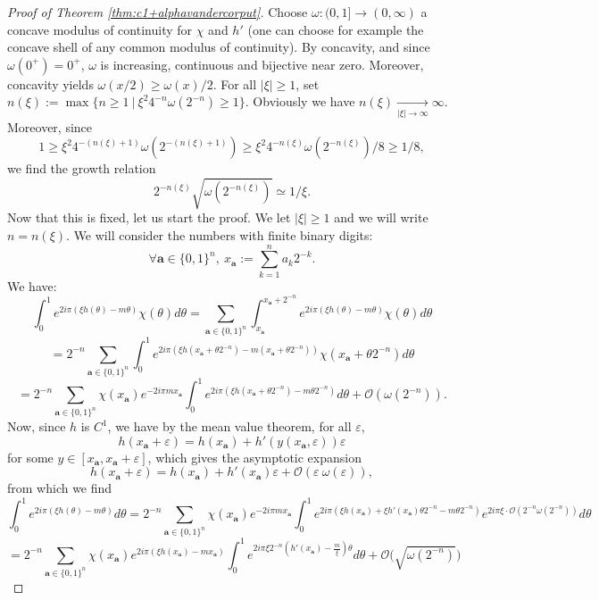 \documentclass[11pt]{amsart}
\theoremstyle{plain}
\theoremstyle{definition}
\numberwithin{equation}{section}
\begin{document}
\begin{proof}[Proof of Theorem \ref{thm:c1+alphavandercorput}]
Choose $\omega:(0,1] \rightarrow (0,\infty)$ a concave modulus of continuity for $\chi$ and $h'$ (one can choose for example the concave shell of any common modulus of continuity). By concavity, and since $\omega(0^+)=0^+$, $\omega$ is increasing, continuous and bijective near zero. Moreover, concavity yields $\omega(x/2) \geq \omega(x)/2$. For all $|\xi| \geq 1$, set $n(\xi) := \max \{ n \geq 1 \ | \ \xi^2 4^{-n} \omega(2^{-n}) \geq 1 \}$. Obviously we have $n(\xi) \underset{|\xi| \rightarrow \infty}{\longrightarrow} \infty$. Moreover, since $$ 1 \geq \xi^{2} 4^{-(n(\xi)+1)} \omega(2^{-(n(\xi)+1)}) \geq \xi^{2} 4^{-n(\xi)} \omega(2^{-n(\xi)})/8 \geq 1/8 ,$$
we find the growth relation
$$ 2^{-n(\xi)} \sqrt{\omega(2^{-n(\xi)})} \simeq 1/\xi .$$
Now that this is fixed, let us start the proof. We let $|\xi| \geq 1$ and we will write $n=n(\xi)$.
We will consider the numbers with finite binary digits: $$\forall \mathbf{a} \in \{0,1\}^{n}, \ x_\mathbf{a} := \sum_{k=1}^n a_k 2^{-k}.$$ We have:
$$\int_{0}^1 e^{2 i \pi (\xi h(\theta) - m \theta)} \chi(\theta) d\theta = \sum_{\mathbf{a} \in \{0,1\}^n} \int_{x_\mathbf{a}}^{x_{\mathbf{a}}+2^{-n}} e^{2 i \pi (\xi h(\theta) - m \theta)} \chi(\theta) d\theta  $$
$$ = 2^{-n} \sum_{\mathbf{a} \in \{0,1\}^n} \int_{0}^{1} e^{2 i \pi (\xi h(x_\mathbf{a}+\theta 2^{-n}) - m (x_\mathbf{a} + \theta 2^{-n}))} \chi(x_\mathbf{a}+\theta 2^{-n}) d\theta $$
$$ = 2^{-n} \sum_{\mathbf{a} \in \{0,1\}^n}  \chi(x_\mathbf{a}) e^{-2 i \pi m x_\mathbf{a}}\int_{0}^{1} e^{2 i \pi (\xi h(x_\mathbf{a}+\theta 2^{-n}) - m \theta 2^{-n})}  d\theta + \mathcal{O}(\omega(2^{-n})).$$
Now, since $h$ is $C^{1}$, we have by the mean value theorem, for all $\varepsilon$,
$$ h(x_{\mathbf{a}} + \varepsilon) = h(x_\mathbf{a})+h'(y(x_{\mathbf{a}},\varepsilon)) \varepsilon $$ for some $y \in [x_\mathbf{a},x_{\mathbf{a}}+\varepsilon]$, which gives the asymptotic expansion
$$ h(x_{\mathbf{a}} + \varepsilon) = h(x_\mathbf{a})+h'(x_\mathbf{a}) \varepsilon + \mathcal{O}(\varepsilon \  \omega(\varepsilon)), $$
from which we find
$$ \int_{0}^1 e^{2 i \pi (\xi h(\theta) - m \theta)} d\theta =  2^{-n} \sum_{\mathbf{a} \in \{0,1\}^n} \chi(x_\mathbf{a}) e^{-2 i \pi m x_\mathbf{a}}\int_{0}^{1} e^{2 i \pi (\xi h(x_\mathbf{a})+\xi h'(x_\mathbf{a}) \theta 2^{-n}  - m \theta 2^{-n})} e^{2 i \pi \xi \cdot \mathcal{O}(2^{-n} \omega(2^{-n}))} d\theta $$ $$ = 2^{-n} \sum_{\mathbf{a} \in \{0,1\}^n} \chi(x_\mathbf{a}) e^{2 i \pi (\xi h(x_\mathbf{a})-m x_\mathbf{a})} \int_{0}^{1} e^{2 i \pi \xi 2^{-n} ( h'(x_\mathbf{a}) - \frac{m}{\xi}) \theta} d\theta + \mathcal{O}\big(\sqrt{\omega(2^{-n})}\big) $$

\end{proof}
\end{document}
